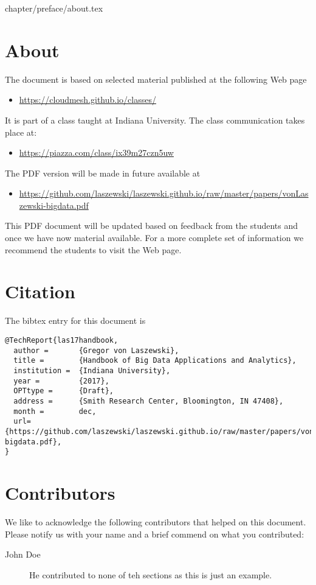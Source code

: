 \begin{fileremark}chapter/preface/about.tex\end{fileremark}

\section{About}\label{about}

The document is based on selected material published at the following
Web page

\begin{itemize}
\item
  \url{https://cloudmesh.github.io/classes/}
\end{itemize}

It is part of a class taught at Indiana University. The class
communication takes place at:

\begin{itemize}
\item
  \url{https://piazza.com/class/ix39m27czn5uw}
\end{itemize}

The PDF version will be made in future available at 

\begin{itemize}
\item
\url{https://github.com/laszewski/laszewski.github.io/raw/master/papers/vonLaszewski-bigdata.pdf}
\end{itemize}

This PDF document will be updated based on feedback from the students
and once we have now material available. For a more complete set of
information we recommend the students to visit the Web page.

\section{Citation}

The bibtex entry for this document is

\begin{verbatim}
@TechReport{las17handbook,
  author =       {Gregor von Laszewski},
  title =        {Handbook of Big Data Applications and Analytics},
  institution =  {Indiana University},
  year =         {2017},
  OPTtype =      {Draft},
  address =      {Smith Research Center, Bloomington, IN 47408},
  month =        dec,
  url={https://github.com/laszewski/laszewski.github.io/raw/master/papers/vonLaszewski-bigdata.pdf},
}
\end{verbatim}

\section{Contributors}

We like to acknowledge the following contributors that helped on this
document. Please notify us with your name and a brief commend on what
you contributed:

\begin{description}
\item[John Doe] He contributed to none of teh sections as this is just
  an example.
\end{description}